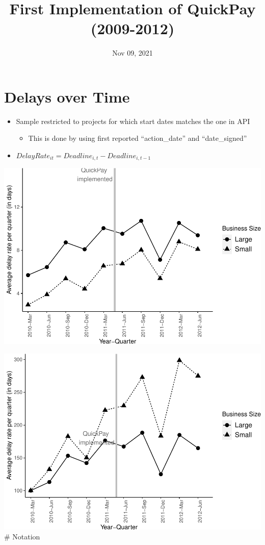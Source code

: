 \documentclass[
]{article}
\title{First Implementation of QuickPay (2009-2012)}
\author{}
\date{\vspace{-2.5em}Nov 09, 2021}
\providecommand{\tightlist}{%
  \setlength{\itemsep}{0pt}\setlength{\parskip}{0pt}}
\begin{document}
\maketitle

\hypertarget{delays-over-time}{%
\section{Delays over Time}\label{delays-over-time}}

\begin{itemize}
\tightlist
\item
  Sample restricted to projects for which start dates matches the one in
  API

  \begin{itemize}
  \tightlist
  \item
    This is done by using first reported ``action\_date'' and
    ``date\_signed''
  \end{itemize}
\item
  \(DelayRate_{it}=Deadline_{i,t} - Deadline_{i,t-1}\)
\end{itemize}

\includegraphics{qp_first_implementation_files/figure-latex/plot-1.pdf}

\includegraphics{qp_first_implementation_files/figure-latex/normalized_plot-1.pdf}
\# Notation
\end{document}
